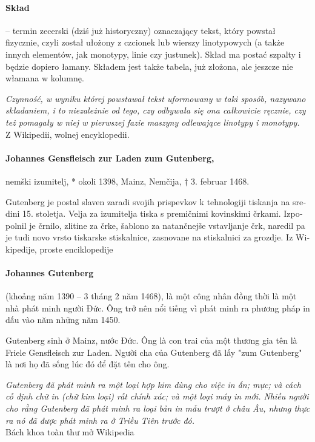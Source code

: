 \documentclass[pagesize,DIV14]{scrartcl}
\begin{document}
\begin{multicols}{2}
\begin{polish}
\paragraph*{Skład} – termin zecerski (dziś już historyczny) oznaczający tekst, który powstał fizycznie, czyli został ułożony z czcionek lub wierszy linotypowych (a także innych elementów, jak monotypy, linie czy justunek). Skład ma postać szpalty i będzie dopiero łamany. Składem jest także tabela, już złożona, ale jeszcze nie włamana w kolumnę.\par
\textit{Czynność, w wyniku której powstawał tekst uformowany w taki sposób, nazywano składaniem, i to niezależnie od tego, czy odbywała się ona całkowicie ręcznie, czy też pomagały w niej w pierwszej fazie maszyny odlewające linotypy i monotypy.}\\
{\scriptsize Z Wikipedii, wolnej encyklopedii.}
\end{polish}
\begin{slovenian}
\paragraph*{Johannes Gensfleisch zur Laden zum Gutenberg,} nemški izumitelj, * okoli 1398, Mainz, Nemčija, † 3. februar 1468.\par
Gutenberg je postal slaven zaradi svojih prispevkov k tehnologiji tiskanja na sredini 15. stoletja. Velja za izumitelja tiska s premičnimi kovinskimi črkami. Izpopolnil je črnilo, zlitine za črke, šablono za natančnejše vstavljanje črk, naredil pa je tudi novo vrsto tiskarske stiskalnice, zasnovane na stiskalnici za grozdje.
{\scriptsize Iz Wikipedije, proste enciklopedije}
\end{slovenian}

\begin{vietnamese}
\paragraph*{Johannes Gutenberg} (khoảng năm 1390 – 3 tháng 2 năm 1468), là một công nhân đồng thời là một nhà phát minh người Đức. Ông trở nên nổi tiếng vì phát minh ra phương pháp in dấu vào năm những năm 1450.

Gutenberg sinh ở Mainz, nước Đức. Ông là con trai của một thương gia tên là Friele Gensfleisch zur Laden. Người cha của Gutenberg đã lấy "zum Gutenberg" là nơi họ đã sống lúc đó để đặt tên cho ông.

\textit{Gutenberg đã phát minh ra một loại hợp kim dùng cho việc in ấn; mực; và cách cố định chữ in (chữ kim loại) rất chính xác; và một loại máy in mới. Nhiều người cho rằng Gutenberg đã phát minh ra loại bản in mẫu trượt ở châu Âu, nhưng thực ra nó đã được phát minh ra ở Triều Tiên trước đó.}\\
{\scriptsize Bách khoa toàn thư mở Wikipedia}
\end{vietnamese}
\begin{serbian}

\end{serbian}
\end{multicols}
\end{document}
